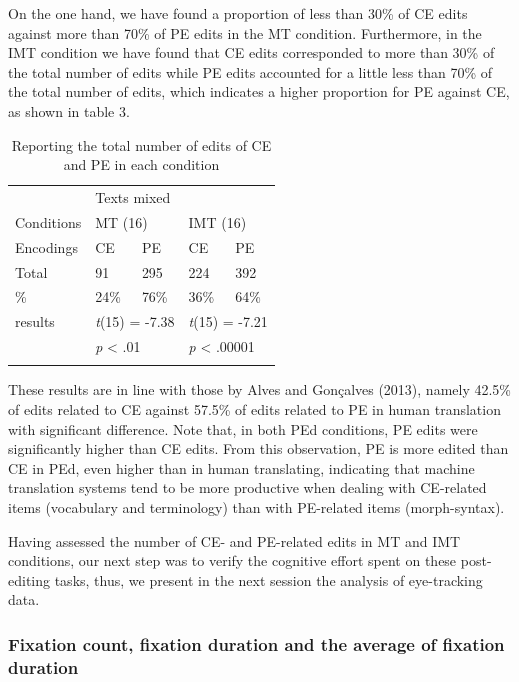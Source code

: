 \documentclass[output=paper]{langsci/langscibook}
\begin{document}
On the one hand, we have found a proportion of less than 30\% of CE edits against more than 70\% of PE edits in the MT condition. Furthermore, in the IMT condition we have found that CE edits corresponded to more than 30\% of the total number of edits while PE edits accounted for a little less than 70\% of the total number of edits, which indicates a higher proportion for PE against CE, as shown in table 3. 

\begin{table}
\begin{tabular}{lllll}
\lsptoprule
~ & \multicolumn{4}{l}{Texts mixed}\\
Conditions & \multicolumn{2}{l}{MT (16)} & \multicolumn{2}{l}{IMT (16)}\\
Encodings & {CE } & PE & {CE } & PE\\
Total & {91} & 295 & {224} & 392\\
\% & {24\%} & 76\% & {36\%} & 64\%\\
results & \multicolumn{2}{l}{\textit{t}(15) = -7.38} & \multicolumn{2}{l}{\textit{t}(15) = -7.21}\\
~ & \multicolumn{2}{l}{\textit{p} {\textless} .01} & \multicolumn{2}{l}{\textit{p} {\textless} .00001}\\
\lspbottomrule
\end{tabular}
\caption{Reporting the total number of edits of CE and PE in each condition}
\label{tab:3}
\end{table}


These results are in line with those by Alves and Gonçalves (2013), namely 42.5\% of edits related to CE against 57.5\% of edits related to PE in human translation with significant difference. Note that, in both PEd conditions, PE edits were significantly higher than CE edits. From this observation, PE is more edited than CE in PEd, even higher than in human translating, indicating that machine translation systems tend to be more productive when dealing with CE-related items (vocabulary and terminology) than with PE-related items (morph-syntax).  



Having assessed the number of CE- and PE-related edits in MT and IMT conditions, our next step was to verify the cognitive effort spent on these post-editing tasks, thus, we present in the next session the analysis of eye-tracking data.


\subsubsection{Fixation count, fixation duration and the average of fixation duration}
\end{document}
